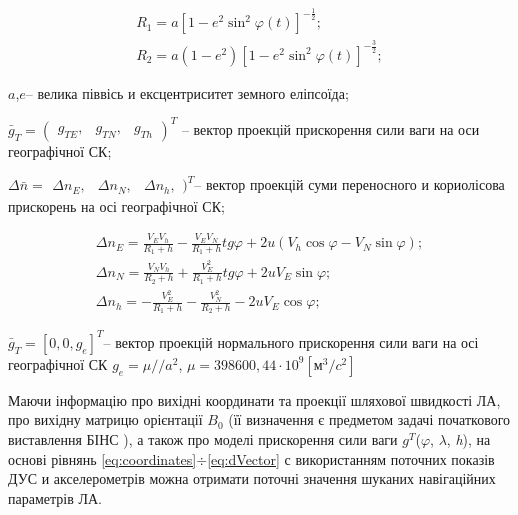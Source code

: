 \[\begin{array}{l} 
{R_{1} =a\left[1-e^{2} \sin ^{2} \varphi (t)\right]^{-\frac{1}{2}};} \\ 
{R_{2} =a\left(1-e^{2} \right)\left[1-e^{2} \sin ^{2} \varphi(t)\right]^{-\frac{3}{2}};} 
\end{array}\] 
\begin{ESKDexplanation}
\item $a$,$e$-- велика піввісь и ексцентриситет земного еліпсоїда;
\item $\bar{g}_{T} =(\begin{array}{ccc}{g_{TE},}&{g_{TN},}&{g_{Th} }\end{array})^{T} $
-- вектор проекцій прискорення сили ваги на оси географічної СК;
\item $\Delta \bar{n}=\begin{array}{ccc} {\Delta n_{E} ,} & {\Delta n_{N} ,} & {
\Delta n_{h} ,} \end{array})^{T} $-- вектор проекцій суми переносного и кориолісова 
прискорень на осі географічної СК;
\end{ESKDexplanation}
\[\begin{array}{l} 
{\Delta n_{E} =\frac{V_{E} V_{h} }{R_{1} +h} -\frac{V_{E} V_{N}}{R_{1} +h} tg\varphi +2u\left(V_{h} \cos \varphi -V_{N} \sin \varphi \right);} \\ 
{\Delta n_{N} =\frac{V_{N} V_{h} }{R_{2} +h} +\frac{V_{E}^{2} }{R_{1} +h} tg\varphi+2uV_{E} \sin \varphi ;} \\ 
{\Delta n_{h} =-\frac{V_{E}^{2} }{R_{1} +h} -\frac{V_{N}^{2}}{R_{2} +h} -2uV_{E} \cos \varphi ;} 
\end{array}\] 
\begin{ESKDexplanation}
\item $\bar{g}_{T} =\left[0,0,g_{e} \right]^{T} $-- вектор проекцій нормального 
прискорення сили ваги на осі географічної СК 
$g_{e}=\mu//a^{2}$, $\mu=398600,44\cdot 10^{9} \left[\text{м}^{3}/c^{2} \right]$
\end{ESKDexplanation}


Маючи інформацію  про вихідні координати та проекції шляхової швидкості ЛА, про вихідну 
матрицю орієнтації $B_{0}$ (її визначення є предметом задачі початкового виставлення  
БІНС ), а також про моделі прискорення сили ваги $g^{T}$($\varphi $, $\lambda $, \textit{h}), 
на основі рівнянь \eqref{eq:coordinates}$\div $\eqref{eq:dVector} с використанням  
поточних показів ДУС и акселерометрів можна отримати поточні значення  шуканих навігаційних 
параметрів ЛА.

